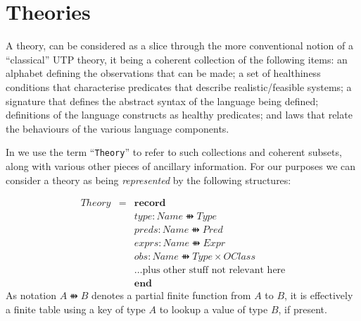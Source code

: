 \section{ Theories}\label{sec:theories}


A  theory,
can be considered as a slice through the more conventional notion
of a ``classical'' UTP theory, it being
a coherent collection of the following items:
an alphabet defining the observations that can be made;
a set of healthiness conditions that characterise predicates that describe
realistic/feasible systems;
a signature that defines the abstract syntax of the language being defined;
definitions of the language constructs as healthy predicates;
and
laws that relate the behaviours of the various language components.

In  we use the term ``\texttt{Theory}'' to refer to
such collections and coherent subsets,
along with various other pieces of ancillary information. For our purposes we can consider
a theory as being \emph{represented} by the following structures:

\begin{eqnarray*}
   Theory &=& \textbf{record}
\\ && type : Name \ffun Type
\\ && preds : Name \ffun Pred
\\ && exprs : Name \ffun Expr
\\ && obs : Name \ffun Type \times OClass
\\ && \ldots \mbox{plus other stuff not relevant here}
\\ && \textbf{end}
\end{eqnarray*}
As notation $A \ffun B$ denotes a partial finite function from $A$
to $B$, it is effectively a finite table using a key of type $A$ to lookup
a value of type $B$, if present.


